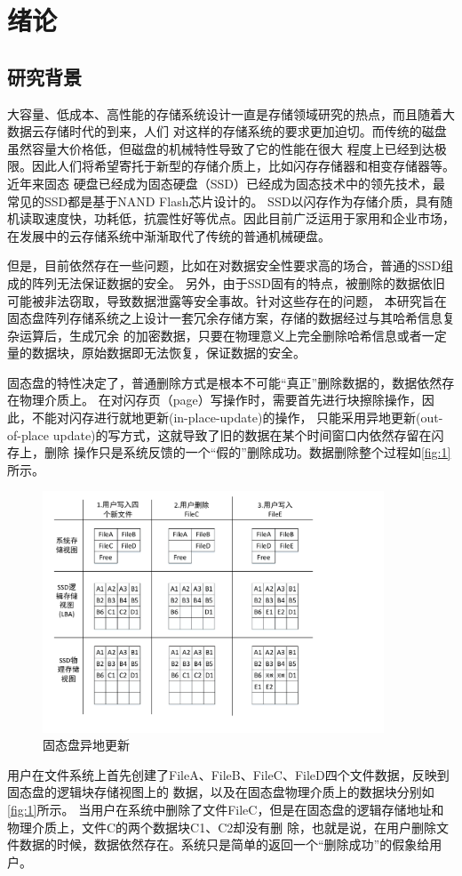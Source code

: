 
\chapter{绪论}

\section{研究背景}
大容量、低成本、高性能的存储系统设计一直是存储领域研究的热点，而且随着大数据云存储时代的到来，人们
对这样的存储系统的要求更加迫切。而传统的磁盘虽然容量大价格低，但磁盘的机械特性导致了它的性能在很大
程度上已经到达极限。因此人们将希望寄托于新型的存储介质上，比如闪存存储器和相变存储器等。近年来固态
硬盘已经成为固态硬盘（SSD）已经成为固态技术中的领先技术，最常见的SSD都是基于NAND Flash芯片设计的。
SSD以闪存作为存储介质，具有随机读取速度快，功耗低，抗震性好等优点。因此目前广泛运用于家用和企业市场，
在发展中的云存储系统中渐渐取代了传统的普通机械硬盘。


但是，目前依然存在一些问题，比如在对数据安全性要求高的场合，普通的SSD组成的阵列无法保证数据的安全。
另外，由于SSD固有的特点，被删除的数据依旧可能被非法窃取，导致数据泄露等安全事故。针对这些存在的问题，
本研究旨在固态盘阵列存储系统之上设计一套冗余存储方案，存储的数据经过与其哈希信息复杂运算后，生成冗余
的加密数据，只要在物理意义上完全删除哈希信息或者一定量的数据块，原始数据即无法恢复，保证数据的安全。


固态盘的特性决定了，普通删除方式是根本不可能“真正”删除数据的，数据依然存在物理介质上\cite{ssd-outofplace-and-trim}。
在对闪存页（page）写操作时，需要首先进行块擦除操作，因此，不能对闪存进行就地更新(in-place-update)的操作，
只能采用异地更新(out-of-place update)的写方式，这就导致了旧的数据在某个时间窗口内依然存留在闪存上，删除
操作只是系统反馈的一个“假的”删除成功。数据删除整个过程如\autoref{fig:1}所示。
\begin{figure}
\centering
\includegraphics[width=4in]{Pics/fig-out-of-place.pdf}
\caption{固态盘异地更新}\label{fig:1}
\end{figure}
用户在文件系统上首先创建了FileA、FileB、FileC、FileD四个文件数据，反映到固态盘的逻辑块存储视图上的
数据，以及在固态盘物理介质上的数据块分别如\autoref{fig:1}所示。
当用户在系统中删除了文件FileC，但是在固态盘的逻辑存储地址和物理介质上，文件C的两个数据块C1、C2却没有删
除，也就是说，在用户删除文件数据的时候，数据依然存在。系统只是简单的返回一个“删除成功”的假象给用户。


